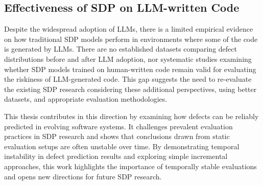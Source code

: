 \documentclass[\main/thesis.tex]{subfiles}
\begin{document}
\subsection{Effectiveness of SDP on LLM-written Code}

Despite the widespread adoption of LLMs, there is a limited empirical evidence on how traditional SDP models perform in environments where some of the code is generated by LLMs.
There are no established datasets comparing defect distributions before and after LLM adoption, nor systematic studies examining whether SDP models trained on human-written code remain valid for evaluating the riskiness of LLM-generated code. This gap suggests the need to re-evaluate the existing SDP research considering these additional perspectives, using better datasets, and appropriate evaluation methodologies. 
 
This thesis contributes in this direction by examining how defects can be reliably predicted in evolving software systems. It challenges prevalent evaluation practices in SDP research and shows that conclusions drawn from static evaluation setups are often unstable over time. By demonstrating temporal instability in defect prediction results and exploring simple incremental  approaches, this work highlights the importance of temporally stable evaluations and opens new directions for future SDP research.
\end{document}
